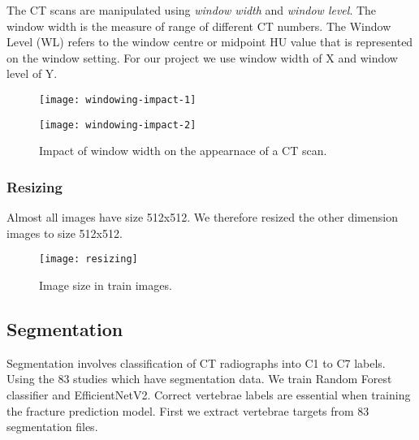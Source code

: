 \documentclass[pdflatex,sn-mathphys]{sn-jnl}%
\theoremstyle{thmstyleone}%
\theoremstyle{thmstyletwo}%
\theoremstyle{thmstylethree}%
\begin{document}
\vspace*{-5mm}
The CT scans are manipulated using \emph{window width} and \emph{window level}. The window width is the measure of range of different CT numbers. The Window Level (WL) refers to the window centre or midpoint HU value that is represented on the window setting. For our project we use window width of X and window level of Y\cite{DBLP:journals/corr/abs-1812-00572}.

\vspace*{-5mm}
\begin{figure}[H]
\centering
\begin{minipage}[c]{0.5\textwidth}
    \centering
    \texttt{[image: windowing-impact-1]}
    
    \label{fig:mesh3.1}
\end{minipage}\hfill
\begin{minipage}[c]{0.5\textwidth}
    \centering
    \texttt{[image: windowing-impact-2]}
    \label{fig:mesh3.2}
\end{minipage}
\caption{\centering\footnotesize{Impact of window width on the appearnace of a CT scan. }}
\end{figure}

\subsubsection{Resizing}

Almost all images have size 512x512. We therefore resized the other dimension images to  size 512x512.

\vspace*{-5mm}
\begin{figure}[H]
 \begin{minipage}[c]{1\textwidth}
 \centering
    \texttt{[image: resizing]}
    \caption{\centering\footnotesize{ Image size in train images. }}
    \label{fig:mesh4}
\end{minipage}
\end{figure}

\subsection{Segmentation}\label{subsubsec1}

Segmentation involves classification of CT radiographs into C1 to C7 labels. Using the 83 studies which have segmentation data. We train Random Forest classifier\cite{SEG:RandForest} and EfficientNetV2\cite{DBLP:conf/icml/TanL21}. Correct vertebrae labels are essential when training the fracture prediction model. First we extract vertebrae targets from 83 segmentation files.
\end{document}
